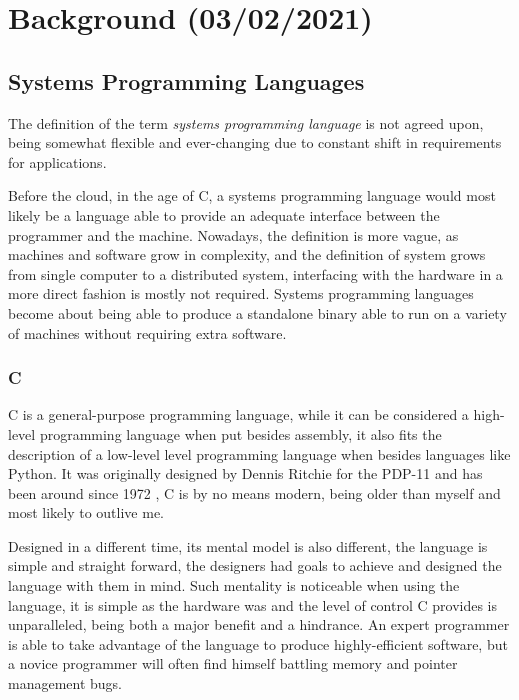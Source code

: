 \chapter{Background (03/02/2021)}\label{cha:background}

\section{Systems Programming Languages}\label{sec:systems-programming}

The definition of the term \emph{systems programming language} is not agreed upon,
being somewhat flexible and ever-changing due to constant shift in requirements for applications.

Before the cloud, in the age of C, a systems programming language would
most likely be a language able to provide an adequate interface between the programmer and the machine.
Nowadays, the definition is more vague, as machines and software grow in complexity,
and the definition of system grows from single computer to a distributed system,
interfacing with the hardware in a more direct fashion is mostly not required.
Systems programming languages become about being able to produce a standalone
binary able to run on a variety of machines without requiring extra software.

\subsection{C}

C is a general-purpose programming language, while it can be considered a high-level programming language
when put besides assembly, it also fits the description of a low-level level programming language when besides languages like Python.
It was originally designed by Dennis Ritchie for the PDP-11 and has been around since 1972 \autocite{Kernighan1988},
C is by no means modern, being older than myself and most likely to outlive me.

Designed in a different time, its mental model is also different, the language is simple and straight forward,
the designers had goals to achieve and designed the language with them in mind.
Such mentality is noticeable when using the language,
it is simple as the hardware was and the level of control C provides is unparalleled,
being both a major benefit and a hindrance.
An expert programmer is able to take advantage of the language to produce highly-efficient software,
but a novice programmer will often find himself battling memory and pointer management bugs.

